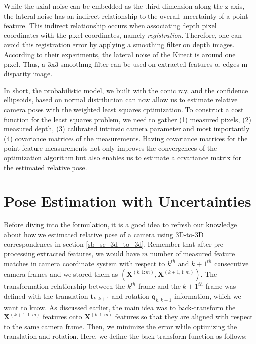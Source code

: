 \documentclass[a4paper]{report}
\numberwithin{figure}{section}
\begin{document}
While the axial noise can be embedded as the third dimension along the z-axis,
the lateral noise has an indirect relationship to the overall uncertainty of a
point feature. This indirect relationship occurs when associating depth pixel
coordinates with the pixel coordinates, namely \textit{registration}.
Therefore, one can avoid this registration error by applying a smoothing filter
on depth images.  According to their experiments, the lateral noise of the
Kinect is around one pixel.  Thus, a 3x3 smoothing filter can be used on
extracted features or edges in disparity image.

In short, the probabilistic model, we built with the conic ray, and the
confidence ellipsoids, based on normal distribution can now allow us to
estimate relative camera poses with the weighted least squares optimization.
To construct a cost function for the least squares problem, we need to gather
(1) measured pixels, (2) measured depth, (3) calibrated intrinsic camera
parameter and most importantly (4) covariance matrices of the measurements.
Having covariance matrices for the point feature measurements not only improves
the convergences of the optimization algorithm but also enables us to estimate
a covariance matrix for the estimated relative pose. 



\section{Pose Estimation with Uncertainties} \label{sc_rel_pose_est_w_uncertainty}

Before diving into the formulation, it is a good idea to refresh our knowledge
about how we estimated relative pose of a camera using 3D-to-3D correspondences
in section \ref{sb_sc_3d_to_3d}.  Remember that after pre-processing extracted
features, we would have $m$ number of measured feature matches in camera
coordinate system with respect to $k^{th}$ and $k+1^{th}$ consecutive camera
frames and we stored them as $(\mathbf{X}^{(k,1:m)},
\mathbf{X}^{(k+1,1:m)})$. 
The transformation relationship between the $k^{th}$ frame
and the $k+1^{th}$ frame was defined with the translation $\mathbf{t}_{k,k+1}$
and rotation $\mathbf{q}_{k,k+1}$ information, which we want to know.  As
discussed earlier, the main idea was to back-transform the
$\mathbf{X}^{(k+1,1:m)}$ features onto $\mathbf{X}^{(k,1:m)}$ features so
that they are aligned with respect to the same camera frame.  Then, we minimize
the error while optimizing the translation and rotation.  Here, we define the
back-transform function as follows:
\end{document}
